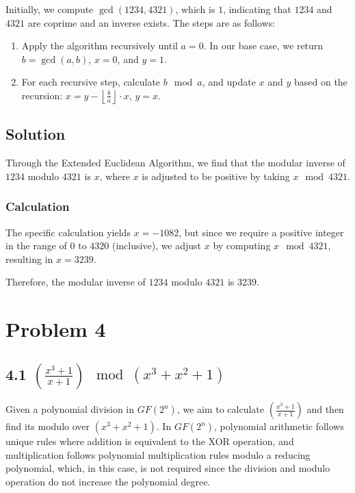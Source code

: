 \documentclass[9pt]{article}
\begin{document}
\begin{CJK*}{UTF8}{gbsn}
Initially, we compute \(\gcd(1234, 4321)\), which is \(1\), indicating that \(1234\) and \(4321\) are coprime and an inverse exists. The steps are as follows:

\begin{enumerate}
    \item Apply the algorithm recursively until \(a = 0\). In our base case, we return \(b = \gcd(a, b)\), \(x = 0\), and \(y = 1\).
    \item For each recursive step, calculate \(b \mod a\), and update \(x\) and \(y\) based on the recursion: \(x = y - \left\lfloor \frac{b}{a} \right\rfloor \cdot x\), \(y = x\).
\end{enumerate}

\subsection*{Solution}
Through the Extended Euclidean Algorithm, we find that the modular inverse of \(1234\) modulo \(4321\) is \(x\), where \(x\) is adjusted to be positive by taking \(x \mod 4321\).

\subsubsection*{Calculation}
The specific calculation yields \(x = -1082\), but since we require a positive integer in the range of \(0\) to \(4320\) (inclusive), we adjust \(x\) by computing \(x \mod 4321\), resulting in \(x = 3239\).

Therefore, the modular inverse of \(1234\) modulo \(4321\) is \(3239\).

\newpage

\section{Problem 4}

\subsection*{4.1 $(\frac{x^3 + 1}{x + 1}) \mod (x^3 + x^2 + 1)$}

Given a polynomial division in \(GF(2^n)\), we aim to calculate $(\frac{x^3 + 1}{x + 1})$ and then find its modulo over $(x^3 + x^2 + 1)$. In \(GF(2^n)\), polynomial arithmetic follows unique rules where addition is equivalent to the XOR operation, and multiplication follows polynomial multiplication rules modulo a reducing polynomial, which, in this case, is not required since the division and modulo operation do not increase the polynomial degree.


\end{CJK*}
\end{document}
